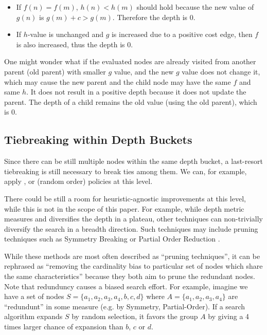 \begin{itemize}
 \item 
       If $f(n)=f(m)$, $h(n)<h(m)$ should hold because the new value of
       $g(n)$ is $g(m)+c>g(m)$. Therefore the depth is 0.
 \item If $h$-value is unchanged and $g$ is increased due to a positive
       cost edge, then $f$ is also increased, thus the depth is 0.
\end{itemize}

One might wonder what if the evaluated nodes are already visited from
another parent (old parent) with smaller $g$ value, and the new $g$ value does not change it,
which may cause the new parent and the child node may have the same $f$ and
same $h$. It does not result in a positive depth because it does not update the parent. The depth of a
child remains the old value (using the old parent), which is 0.


\subsection{Tiebreaking within Depth Buckets}

Since there can be still multiple nodes within the same depth bucket, a
last-resort tiebreaking is still necessary to break ties among them.
We can, for example, apply \lifo, \fifo or \ro (random order) policies
at this level.

There could be still a room for heuristic-agnostic improvements at
this level, while this is not in the scope of this paper.
For example, while depth metric measures and diversifies the depth in a plateau,
other techniques can non-trivially diversify the search in a breadth direction.
Such techniques may include pruning techniques such as 
Symmetry Breaking \cite{Fox1998,pochter2011exploiting,domshlak2013symmetry}
or Partial Order Reduction \cite{hall2013faster,wehrle2013relative}.

While these methods are most often described as ``pruning techniques'',
it can be rephrased as ``removing the cardinality bias to particular set
of nodes which share the same characteristics'' because they both aim to
prune the redundant nodes. Note that redunduncy causes a biased 
search effort. For example, imagine we have a
set of nodes $S=\{a_1, a_2, a_3, a_4, b, c, d\}$ where
$A=\{a_1, a_2, a_3, a_4\}$ are ``redundunt'' in some measure (e.g. by Symmetry,
Partial-Order). 
If a search algorithm expands $S$ by random selection, it favors the
group $A$ by giving a 4 times larger chance of expansion than $b$,
$c$ or $d$.

